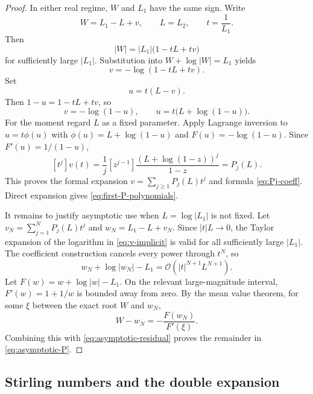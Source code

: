 \documentclass[11pt]{article}
\numberwithin{equation}{section}
\theoremstyle{definition}
\theoremstyle{remark}
\begin{document}
\begin{proof}
In either real regime, $W$ and $L_1$ have the same sign.  Write
\begin{equation}
  W=L_1-L+v,
  \qquad L=L_2,
  \qquad t=\frac1{L_1}.                               \label{eq:asymptotic-substitution}
\end{equation}
Then
\[
 |W|=|L_1|\bigl(1-tL+tv\bigr)
\]
for sufficiently large $|L_1|$.  Substitution into
$W+\log|W|=L_1$ yields
\begin{equation}
  v=-\log(1-tL+tv).                                    \label{eq:v-implicit}
\end{equation}
Set
\begin{equation}
  u=t(L-v).                                            \label{eq:u-asymptotic}
\end{equation}
Then $1-u=1-tL+tv$, so
\begin{equation}
  v=-\log(1-u),
  \qquad
  u=t\bigl(L+\log(1-u)\bigr).                         \label{eq:u-lagrange-asymptotic}
\end{equation}
For the moment regard $L$ as a fixed parameter.  Apply Lagrange inversion to
$u=t\phi(u)$ with
$\phi(u)=L+\log(1-u)$ and $F(u)=-\log(1-u)$.  Since
$F'(u)=1/(1-u)$,
\[
 [t^j]v(t)=\frac1j[z^{j-1}]
 \frac{(L+\log(1-z))^j}{1-z}=P_j(L).
\]
This proves the formal expansion
$v=\sum_{j\ge1}P_j(L)t^j$ and formula \eqref{eq:Pj-coeff}.  Direct expansion
gives \eqref{eq:first-P-polynomials}.

It remains to justify asymptotic use when $L=\log|L_1|$ is not fixed.  Let
$v_N=\sum_{j=1}^N P_j(L)t^j$ and
$w_N=L_1-L+v_N$.  Since $|t|L\to0$, the Taylor expansion of the logarithm in
\eqref{eq:v-implicit} is valid for all sufficiently large $|L_1|$.
The coefficient construction cancels every power through $t^N$, so
\[
 w_N+\log|w_N|-L_1
 =\mathcal O(|t|^{N+1}L^{N+1}).                       \label{eq:asymptotic-residual}
\]
Let $F(w)=w+\log|w|-L_1$.  On the relevant large-magnitude interval,
$F'(w)=1+1/w$ is bounded away from zero.  By the mean value theorem, for some
$\xi$ between the exact root $W$ and $w_N$,
\[
 W-w_N=-\frac{F(w_N)}{F'(\xi)}.
\]
Combining this with \eqref{eq:asymptotic-residual} proves the remainder in
\eqref{eq:asymptotic-P}.
\end{proof}

\subsection{Stirling numbers and the double expansion}
\end{document}
